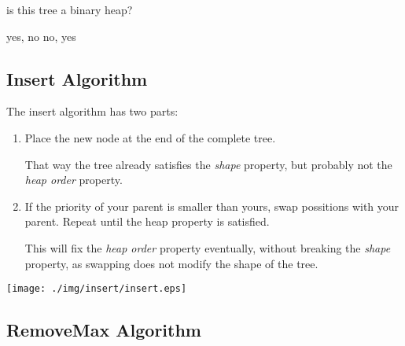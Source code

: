 \documentclass[a4paper, 9pt]{extarticle}
\begin{document}
\begin{blackboard}
  is this tree a binary heap?

  yes, no
  no, yes
\end{blackboard}

\subsection{Insert Algorithm}

The insert algorithm has two parts:

\begin{multicols}{2}
\begin{enumerate}

  \item Place the new node at the end of the complete tree.

    That way the tree already satisfies the \emph{shape} property, but probably
    not the \emph{heap order} property.

  \item If the priority of your parent is smaller than yours, swap possitions
    with your parent. Repeat until the heap property is satisfied.

    This will fix the \emph{heap order} property eventually, without breaking
    the \emph{shape} property, as swapping does not modify the shape of the
    tree.

\end{enumerate}
\columnbreak
\begin{center}
  \texttt{[image: ./img/insert/insert.eps]}
\end{center}
\end{multicols}

\newpage
\subsection{RemoveMax Algorithm}
\end{document}
